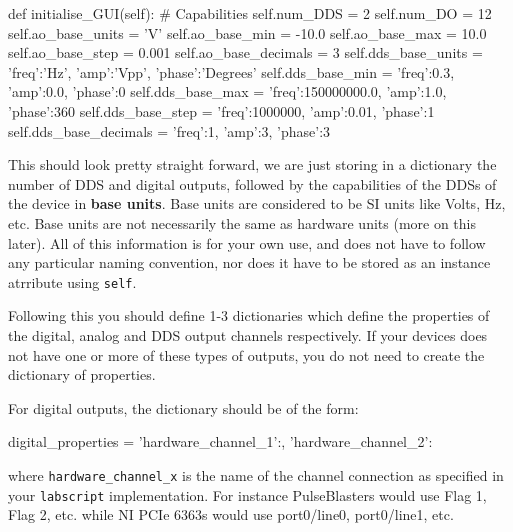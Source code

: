 \documentclass[12pt]{article}
\begin{document}
\begin{python}
def initialise_GUI(self):
    # Capabilities
    self.num_DDS = 2
    self.num_DO = 12
    self.ao_base_units     = 'V'
    self.ao_base_min       = -10.0
    self.ao_base_max       =  10.0
    self.ao_base_step      =  0.001
    self.ao_base_decimals  =  3
    self.dds_base_units    = {'freq':'Hz',        'amp':'Vpp', 'phase':'Degrees'}
    self.dds_base_min      = {'freq':0.3,         'amp':0.0,   'phase':0}
    self.dds_base_max      = {'freq':150000000.0, 'amp':1.0,   'phase':360}
    self.dds_base_step     = {'freq':1000000,     'amp':0.01,  'phase':1}
    self.dds_base_decimals = {'freq':1,           'amp':3,     'phase':3}
\end{python}
This should look pretty straight forward, we are just storing in a dictionary the number of DDS and digital outputs, followed by the capabilities of the DDSs of the device in \textbf{base units}. 
Base units are considered to be SI units like Volts, Hz, etc.
Base units are not necessarily the same as hardware units (more on this later).
All of this information is for your own use, and does not have to follow any particular naming convention, nor does it have to be stored as an instance atrribute using \texttt{self}.

Following this you should define 1-3 dictionaries which define the properties of the digital, analog and DDS output channels respectively.
If your devices does not have one or more of these types of outputs, you do not need to create the dictionary of properties.

For digital outputs, the dictionary should be of the form:
\begin{python}
    digital_properties = {'hardware_channel_1':{},
                          'hardware_channel_2':{}
                         }
\end{python}
where \texttt{hardware\_channel\_x} is the name of the channel connection as specified in your \texttt{labscript} implementation. For instance PulseBlasters would use Flag 1, Flag 2, etc. while NI PCIe 6363s would use port0/line0, port0/line1, etc.
\end{document}
